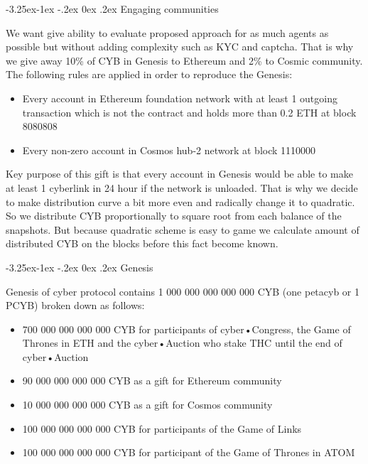 \documentclass[8pt,oneside]{amsart}
\makeatletter
\renewcommand\subsection{\@startsection{subsection}{2}{\z@}%
                                     {-3.25ex\@plus -1ex \@minus -.2ex}%
                                     {0ex \@plus .2ex}%
                                     {\play\Large}}%
\newcommand{\titleSection}[1]{\subsection{#1}}
\newcommand{\code}[1]{{\PlayBold #1}}
\newenvironment{Figure}
  {\par\medskip\noindent\minipage{\linewidth}}
  {\endminipage\par\medskip}
\makeatother
\begin{document}
\titleSection{Engaging communities}\label{welcome}

We want give ability to evaluate proposed approach for as much agents as possible but without adding complexity such as KYC and captcha. That is why we give away 10\% of CYB in Genesis to Ethereum and 2\% to Cosmic community. The following rules are applied in order to reproduce the Genesis:
\begin{itemize}
\item Every account in Ethereum foundation network with at least 1 outgoing transaction which is not the contract and holds more than 0.2 ETH at block 8080808
\item Every non-zero account in Cosmos hub-2 network at block 1110000 
\end{itemize}

Key purpose of this gift is that every account in Genesis would be able to make at least 1 cyberlink in 24 hour if the network is unloaded. That is why we decide to make distribution curve a bit more even and radically change it to quadratic. So we distribute CYB proportionally to square root from each balance of the snapshots. But because quadratic scheme is easy to game we calculate amount of distributed CYB on the blocks before this fact become known.

\titleSection{Genesis}\label{genesis}

Genesis of \code{cyber} protocol contains 1 000 000 000 000 000 CYB (one petacyb or 1 PCYB) broken down as follows:

\begin{itemize}
\item 700 000 000 000 000 CYB for participants of cyber•Congress, the Game of Thrones in ETH and the cyber•Auction who stake THC until the end of cyber•Auction
\item 90 000 000 000 000 CYB as a gift for Ethereum community
\item 10 000 000 000 000 CYB as a gift for Cosmos community
\item 100 000 000 000 000 CYB for participants of the Game of Links
\item 100 000 000 000 000 CYB for participant of the Game of Thrones in ATOM

\end{itemize}

\begin{Figure}
 \centering
 
\end{Figure}
\end{document}
